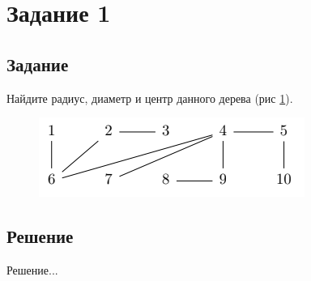 \section*{Задание 1}

\subsection*{Задание}

Найдите радиус, диаметр и центр данного дерева (рис \ref{fig:1t}).

\begin{figure}[H]
    \centering
    \includegraphics[width=0.7\linewidth]{photo/1t}
    \caption{}
    \label{fig:1t}
\end{figure}

\subsection*{Решение}

Решение... 
